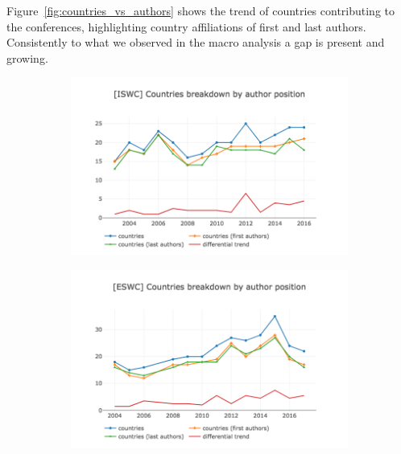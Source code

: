 \documentclass{llncs}
\begin{document}
Figure~\ref{fig:countries_vs_authors} shows the trend of countries contributing to the conferences, highlighting country affiliations of first and last authors.
Consistently to what we observed in the macro analysis a gap is present and growing.
%
\begin{figure}[t]
\begin{subfigure}{.5\textwidth}
	\centering
	\includegraphics[width=\textwidth]{images/iswc_countries_vs_authors.png}
	\caption[ ]{}
	\label{fig:iswc_countries_vs_authors}
\end{subfigure}%
\begin{subfigure}{.5\textwidth}
	\centering
	\includegraphics[width=\textwidth]{images/eswc_countries_vs_authors.png}
	\caption[ ]{}
	\label{fig:eswc_countries_vs_authors}
\end{subfigure}
\centering
\begin{subfigure}{.5\textwidth}
	\centering

\end{subfigure}
\end{figure}
\end{document}
